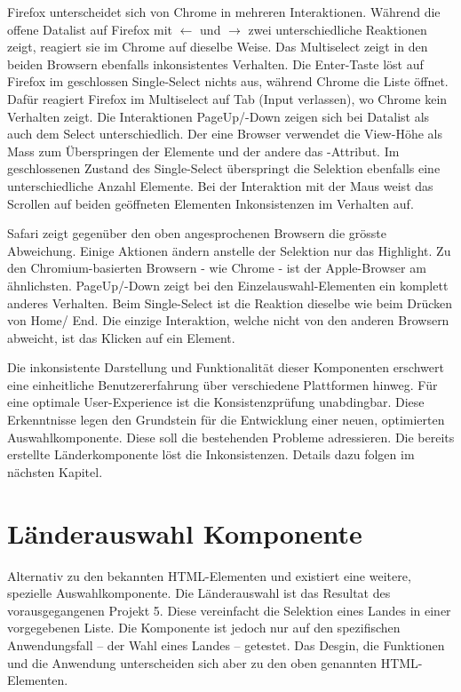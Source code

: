 Firefox unterscheidet sich von Chrome in mehreren Interaktionen. 
Während die offene Datalist auf Firefox mit $\leftarrow$ und $\rightarrow$ zwei unterschiedliche Reaktionen zeigt, reagiert sie im Chrome auf dieselbe Weise. 
Das Multiselect zeigt in den beiden Browsern ebenfalls inkonsistentes Verhalten. 
Die Enter-Taste löst auf Firefox im geschlossen Single-Select nichts aus, während Chrome die Liste öffnet. 
Dafür reagiert Firefox im Multiselect auf Tab (Input verlassen), wo Chrome kein Verhalten zeigt. 
Die Interaktionen PageUp/-Down zeigen sich bei Datalist als auch dem Select unterschiedlich. 
Der eine Browser verwendet die View-Höhe als Mass zum Überspringen der Elemente und der andere das -Attribut. 
Im geschlossenen Zustand des Single-Select überspringt die Selektion ebenfalls eine unterschiedliche Anzahl Elemente. 
Bei der Interaktion mit der Maus weist das Scrollen auf beiden geöffneten Elementen Inkonsistenzen im Verhalten auf. 

Safari zeigt gegenüber den oben angesprochenen Browsern die grösste Abweichung. 
Einige Aktionen ändern anstelle der Selektion nur das Highlight. 
Zu den Chromium-basierten Browsern - wie Chrome - ist der Apple-Browser am ähnlichsten. 
PageUp/-Down zeigt bei den Einzelauswahl-Elementen ein komplett anderes Verhalten. 
Beim Single-Select ist die Reaktion dieselbe wie beim Drücken von Home/ End. 
Die einzige Interaktion, welche nicht von den anderen Browsern abweicht, ist das Klicken auf ein Element. 

Die inkonsistente Darstellung und Funktionalität dieser Komponenten erschwert eine einheitliche Benutzererfahrung über verschiedene Plattformen hinweg. 
Für eine optimale User-Experience ist die Konsistenzprüfung unabdingbar. 
Diese Erkenntnisse legen den Grundstein für die Entwicklung einer neuen, optimierten Auswahlkomponente. 
Diese soll die bestehenden Probleme adressieren. 
Die bereits erstellte Länderkomponente löst die Inkonsistenzen. 
Details dazu folgen im nächsten Kapitel. 


\section{Länderauswahl Komponente}
\label{sec:countryChoice}

Alternativ zu den bekannten HTML-Elementen  und  existiert eine weitere, spezielle Auswahlkomponente. 
Die Länderauswahl\citemarktext{
    [\cite{ip5}]
} ist das Resultat des vorausgegangenen Projekt 5. 
Diese vereinfacht die Selektion eines Landes in einer vorgegebenen Liste. 
Die Komponente ist jedoch nur auf den spezifischen Anwendungsfall – der Wahl eines Landes – getestet. 
Das Desgin, die Funktionen und die Anwendung unterscheiden sich aber zu den oben genannten HTML-Elementen. 


